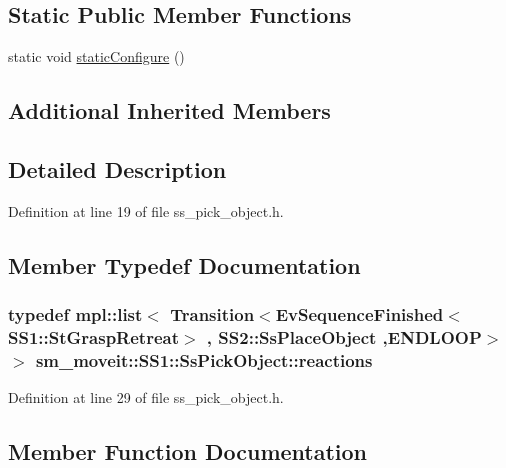 \subsection*{Static Public Member Functions}
\begin{DoxyCompactItemize}
\item 
static void \hyperlink{structsm__moveit_1_1SS1_1_1SsPickObject_ab589ae81913b79dda9f94d03e5b0fa86}{static\+Configure} ()
\end{DoxyCompactItemize}
\subsection*{Additional Inherited Members}


\subsection{Detailed Description}


Definition at line 19 of file ss\+\_\+pick\+\_\+object.\+h.



\subsection{Member Typedef Documentation}
\subsubsection[{\texorpdfstring{reactions}{reactions}}]{\setlength{\rightskip}{0pt plus 5cm}typedef mpl\+::list$<$ Transition$<$Ev\+Sequence\+Finished$<$S\+S1\+::\+St\+Grasp\+Retreat$>$ , {\bf S\+S2\+::\+Ss\+Place\+Object} ,E\+N\+D\+L\+O\+OP$>$ $>$ {\bf sm\+\_\+moveit\+::\+S\+S1\+::\+Ss\+Pick\+Object\+::reactions}}\hypertarget{structsm__moveit_1_1SS1_1_1SsPickObject_a09ca288c69453a5d565bde88ec871ff9}{}\label{structsm__moveit_1_1SS1_1_1SsPickObject_a09ca288c69453a5d565bde88ec871ff9}


Definition at line 29 of file ss\+\_\+pick\+\_\+object.\+h.



\subsection{Member Function Documentation}
